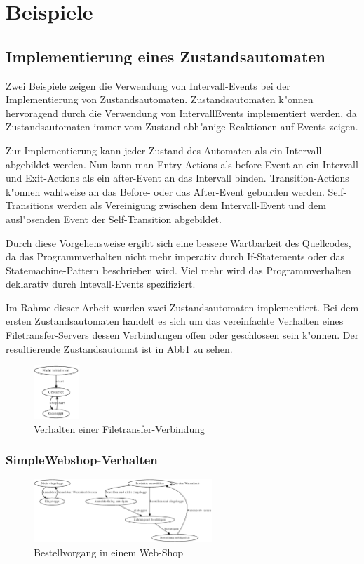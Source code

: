 \section{Beispiele}
\subsection{Implementierung eines Zustandsautomaten}
Zwei Beispiele zeigen die Verwendung von Intervall-Events bei der
Implementierung von Zustandsautomaten. Zustandsautomaten k"onnen hervoragend
durch die Verwendung von IntervallEvents implementiert werden, da
Zustandsautomaten immer vom Zustand abh"anige Reaktionen auf Events zeigen.

Zur Implementierung kann jeder Zustand des Automaten als ein Intervall
abgebildet werden. Nun kann man Entry-Actions als before-Event an ein Intervall
und Exit-Actions als ein after-Event an das Intervall binden. Transition-Actions
k"onnen wahlweise an das Before- oder das After-Event gebunden werden.
Self-Transitions werden als Vereinigung zwischen dem Intervall-Event und dem
ausl"osenden Event der Self-Transition abgebildet. 

Durch diese Vorgehensweise ergibt sich eine bessere Wartbarkeit des
Quellcodes, da das Programmverhalten nicht mehr imperativ durch If-Statements
oder das Statemachine-Pattern beschrieben wird. Viel mehr wird das
Programmverhalten deklarativ durch Intevall-Events spezifiziert.

Im Rahme dieser Arbeit wurden zwei Zustandsautomaten implementiert. Bei dem
ersten Zustandsautomaten handelt es sich um das vereinfachte Verhalten eines
Filetransfer-Servers dessen Verbindungen offen oder geschlossen sein k"onnen. Der
resultierende Zustandsautomat ist in Abb\ref{filetransfer_behaviour} zu sehen.

\begin{figure}[htp]
\begin{center}
  \includegraphics[width=0.15\textwidth]{graphics/tcp_stm.dot.eps}
  \caption{Verhalten einer Filetransfer-Verbindung}
  \label{filetransfer_behaviour}
\end{center}
\end{figure}

\subsubsection{SimpleWebshop-Verhalten}

\begin{figure}[htp]
\begin{center}
  \includegraphics[width=0.6\textwidth]{graphics/webshop.dot.eps}
  \caption{Bestellvorgang in einem Web-Shop}
  \label{webshop_behaviour}
\end{center}
\end{figure}